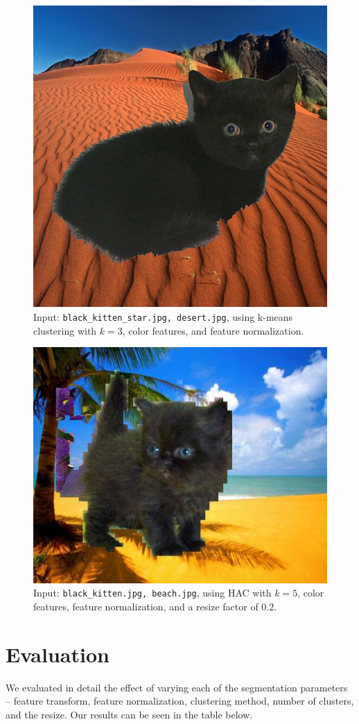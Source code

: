 \documentclass[12pt]{article}
\begin{document}
\begin{figure}[H]
	\centering
	\includegraphics[width=.5\textwidth]{grabcat1.jpg}
	\caption{Input: \texttt{black\_kitten\_star.jpg, desert.jpg}, using k-means clustering with $k = 3$, color features, and feature normalization.}
\end{figure}

\begin{figure}[H]
	\centering
	\includegraphics[width=.5\textwidth]{grabcat2.jpg}
	\caption{Input: \texttt{black\_kitten.jpg, beach.jpg}, using HAC with $k = 5$, color features, feature normalization, and a resize factor of $0.2$.}
\end{figure}

\section{Evaluation}
We evaluated in detail the effect of varying each of the segmentation parameters -- feature transform, feature normalization, clustering method, number of clusters, and the resize. Our results can be seen in the table below.
\end{document}
